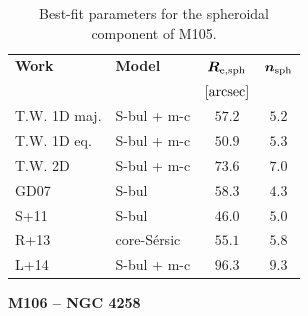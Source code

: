 \documentclass[preprint2]{emulateapj}
\begin{document}
  \begin{table}[h]
  \small
  \caption{Best-fit parameters for the spheroidal component of M105.}
  \begin{center}
  \begin{tabular}{llcc}
  \hline
  {\bf Work} & {\bf Model}   & $\bm R_{\rm e,sph}$    & $\bm n_{\rm sph}$ \\
    &  &  $[\rm arcsec]$ & \\
  \hline
  T.W. 1D maj. & S-bul + m-c & $57.2$  &  $5.2$ \\
  T.W. 1D eq.  & S-bul + m-c & $50.9$  &  $5.3$ \\
  T.W. 2D      & S-bul + m-c & $73.6$  &  $7.0$ \\
  \hline
  GD07         & S-bul & $58.3$  &  $4.3$ \\
  S+11         & S-bul & $46.0$  &  $5.0$ \\
  R+13         & core-S\'ersic & $55.1$  &  $5.8$ \\
  L+14         & S-bul + m-c & $96.3$  &  $9.3$ \\
  \hline
  \end{tabular}
  \end{center}
  \label{tab:m105}
  \end{table}


  \clearpage\newpage\noindent
  {\bf M106 -- NGC 4258 \\} 
  
\end{document}
